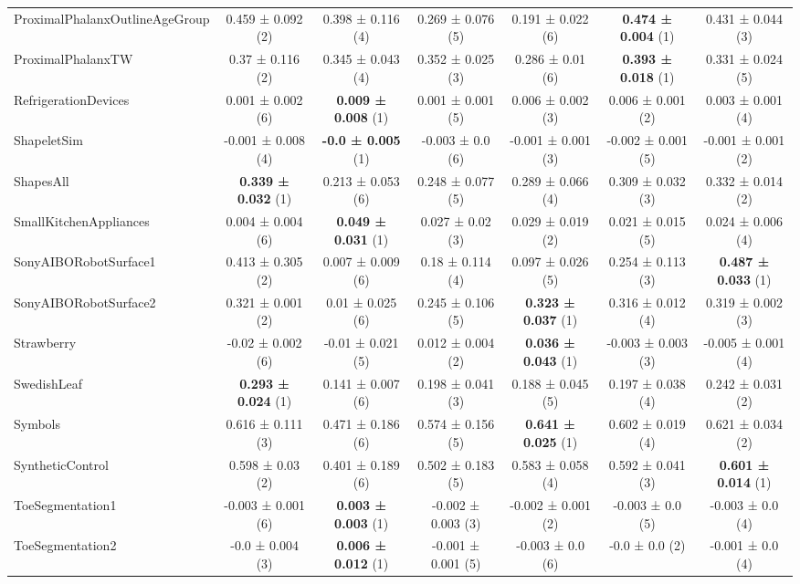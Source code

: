 \begin{table}[ht]
\begin{adjustbox}{width=\textwidth}
\begin{tabular}{lcccccc}
ProximalPhalanxOutlineAgeGroup & 0.459 ± 0.092 (2) & 0.398 ± 0.116 (4) & 0.269 ± 0.076 (5) & 0.191 ± 0.022 (6) & \textbf{0.474 ± 0.004} (1) & 0.431 ± 0.044 (3) \\
ProximalPhalanxTW & 0.37 ± 0.116 (2) & 0.345 ± 0.043 (4) & 0.352 ± 0.025 (3) & 0.286 ± 0.01 (6) & \textbf{0.393 ± 0.018} (1) & 0.331 ± 0.024 (5) \\
RefrigerationDevices & 0.001 ± 0.002 (6) & \textbf{0.009 ± 0.008} (1) & 0.001 ± 0.001 (5) & 0.006 ± 0.002 (3) & 0.006 ± 0.001 (2) & 0.003 ± 0.001 (4) \\
ShapeletSim & -0.001 ± 0.008 (4) & \textbf{-0.0 ± 0.005} (1) & -0.003 ± 0.0 (6) & -0.001 ± 0.001 (3) & -0.002 ± 0.001 (5) & -0.001 ± 0.001 (2) \\
ShapesAll & \textbf{0.339 ± 0.032} (1) & 0.213 ± 0.053 (6) & 0.248 ± 0.077 (5) & 0.289 ± 0.066 (4) & 0.309 ± 0.032 (3) & 0.332 ± 0.014 (2) \\
SmallKitchenAppliances & 0.004 ± 0.004 (6) & \textbf{0.049 ± 0.031} (1) & 0.027 ± 0.02 (3) & 0.029 ± 0.019 (2) & 0.021 ± 0.015 (5) & 0.024 ± 0.006 (4) \\
SonyAIBORobotSurface1 & 0.413 ± 0.305 (2) & 0.007 ± 0.009 (6) & 0.18 ± 0.114 (4) & 0.097 ± 0.026 (5) & 0.254 ± 0.113 (3) & \textbf{0.487 ± 0.033} (1) \\
SonyAIBORobotSurface2 & 0.321 ± 0.001 (2) & 0.01 ± 0.025 (6) & 0.245 ± 0.106 (5) & \textbf{0.323 ± 0.037} (1) & 0.316 ± 0.012 (4) & 0.319 ± 0.002 (3) \\
Strawberry & -0.02 ± 0.002 (6) & -0.01 ± 0.021 (5) & 0.012 ± 0.004 (2) & \textbf{0.036 ± 0.043} (1) & -0.003 ± 0.003 (3) & -0.005 ± 0.001 (4) \\
SwedishLeaf & \textbf{0.293 ± 0.024} (1) & 0.141 ± 0.007 (6) & 0.198 ± 0.041 (3) & 0.188 ± 0.045 (5) & 0.197 ± 0.038 (4) & 0.242 ± 0.031 (2) \\
Symbols & 0.616 ± 0.111 (3) & 0.471 ± 0.186 (6) & 0.574 ± 0.156 (5) & \textbf{0.641 ± 0.025} (1) & 0.602 ± 0.019 (4) & 0.621 ± 0.034 (2) \\
SyntheticControl & 0.598 ± 0.03 (2) & 0.401 ± 0.189 (6) & 0.502 ± 0.183 (5) & 0.583 ± 0.058 (4) & 0.592 ± 0.041 (3) & \textbf{0.601 ± 0.014} (1) \\
ToeSegmentation1 & -0.003 ± 0.001 (6) & \textbf{0.003 ± 0.003} (1) & -0.002 ± 0.003 (3) & -0.002 ± 0.001 (2) & -0.003 ± 0.0 (5) & -0.003 ± 0.0 (4) \\
ToeSegmentation2 & -0.0 ± 0.004 (3) & \textbf{0.006 ± 0.012} (1) & -0.001 ± 0.001 (5) & -0.003 ± 0.0 (6) & -0.0 ± 0.0 (2) & -0.001 ± 0.0 (4) \\

\end{tabular}
\end{adjustbox}
\end{table}

